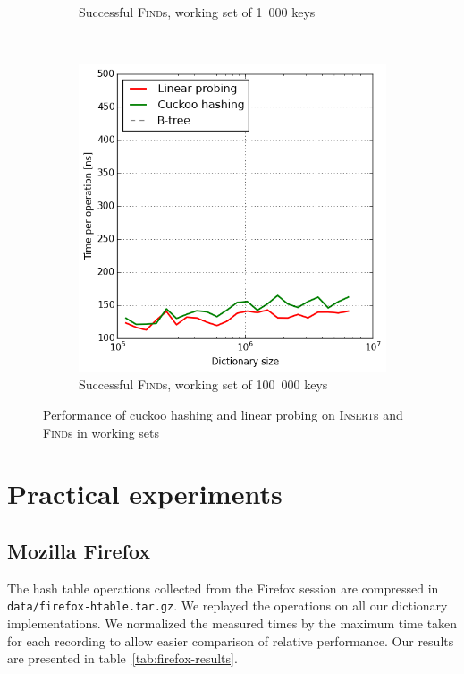 \begin{figure}
\begin{subfigure}[t]{0.31\textwidth}
	\caption{Successful \textsc{Find}s, working set of 1~000 keys}
\end{subfigure}
~
\begin{subfigure}[t]{0.31\textwidth}
	\includegraphics[width=\textwidth]{img/performance/hashing-4}
	\caption{Successful \textsc{Find}s, working set of 100~000 keys}
\end{subfigure}
\caption{Performance of cuckoo hashing and linear probing on \textsc{Insert}s
	and \textsc{Find}s in working sets}
\label{fig:hashing-performance}
\end{figure}

\section{Practical experiments}
\subsection{Mozilla Firefox}
The hash table operations collected from the Firefox session are compressed
in \texttt{data/firefox-htable.tar.gz}. We replayed the operations on all our
dictionary implementations. We normalized the measured times by the maximum
time taken for each recording to allow easier comparison of relative
performance. Our results are presented in table~\ref{tab:firefox-results}.


